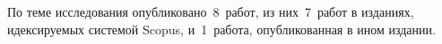 {\begin{refsection}
        По теме исследования опубликовано~8~работ, из них~7~работ в изданиях, идексируемых системой Scopus, и~1~работа, опубликованная в ином издании.
        
    \end{refsection}%
    \begin{refsection}
    \end{refsection}%
}

